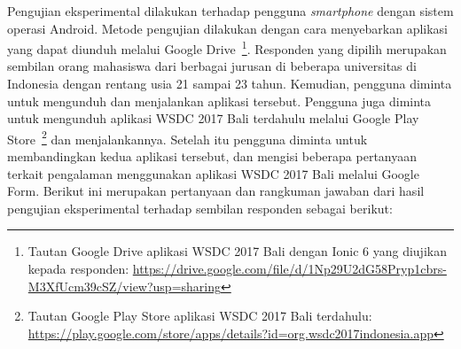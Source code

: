 Pengujian eksperimental dilakukan terhadap pengguna \textit{smartphone} dengan sistem operasi Android. Metode pengujian dilakukan dengan cara menyebarkan aplikasi yang dapat diunduh melalui Google Drive~\footnote{Tautan Google Drive aplikasi WSDC 2017 Bali dengan Ionic 6 yang diujikan kepada responden: \url{https://drive.google.com/file/d/1Np29U2dG58Pryp1cbrs-M3XfUcm39cSZ/view?usp=sharing}}. Responden yang dipilih merupakan sembilan orang mahasiswa dari berbagai jurusan di beberapa universitas di Indonesia dengan rentang usia 21 sampai 23 tahun. Kemudian, pengguna diminta untuk mengunduh dan menjalankan aplikasi tersebut. Pengguna juga diminta untuk mengunduh aplikasi WSDC 2017 Bali terdahulu melalui Google Play Store~\footnote{Tautan Google Play Store aplikasi WSDC 2017 Bali terdahulu: \url{https://play.google.com/store/apps/details?id=org.wsdc2017indonesia.app}} dan menjalankannya. Setelah itu pengguna diminta untuk membandingkan kedua aplikasi tersebut, dan mengisi beberapa pertanyaan terkait pengalaman menggunakan aplikasi WSDC 2017 Bali melalui Google Form. Berikut ini merupakan pertanyaan dan rangkuman jawaban dari hasil pengujian eksperimental terhadap sembilan responden sebagai berikut:

